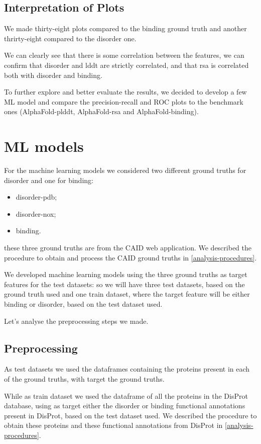 \subsection{Interpretation of Plots}
We made thirty-eight plots compared to the binding ground truth and another thrirty-eight compared to the disorder one. 

We can clearly see that there is some correlation between the features, we can confirm that disorder and lddt are strictly correlated, and that rsa is correlated both with disorder and binding. 

To further explore and better evaluate the results, we decided to develop a few ML model and compare the precision-recall and ROC plots to the benchmark ones (AlphaFold-plddt, AlphaFold-rsa and AlphaFold-binding).

\section{ML models}
For the machine learning models we considered two different ground truths for disorder and one for binding:
\begin{itemize}
    \item disorder-pdb;
    \item disorder-nox;
    \item binding.
\end{itemize}
these three ground truths are from the CAID web application. We described the procedure to obtain and process the CAID ground truths in \ref{analysis-procedures}.

We developed machine learning models using the three ground truths as target features for the test datasets: so we will have three test datasets, based on the ground truth used and one train dataset, where the target feature will be either binding or disorder, based on the test dataset used.

Let's analyse the preprocessing steps we made.

\subsection{Preprocessing}
As test datasets we used the dataframes containing the proteins present in each of the ground truths, with target the ground truths.

While as train dataset we used the dataframe of all the proteins in the DisProt database, using as target either the disorder or binding functional annotations present in DisProt, based on the test dataset used. We described the procedure to obtain these proteins and these functional annotations from DisProt in \ref{analysis-procedures}.

